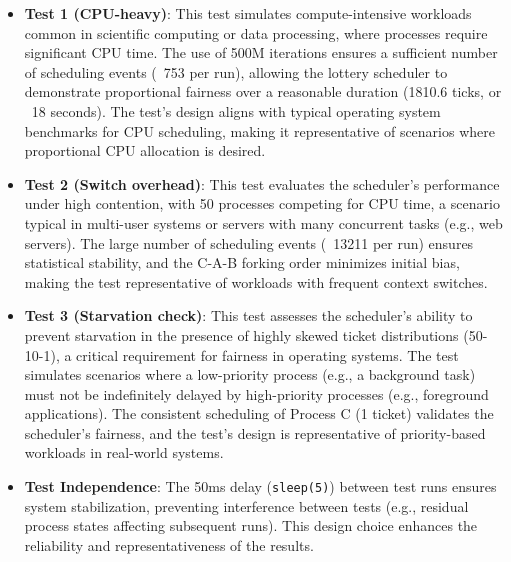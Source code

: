 \documentclass{article}
\begin{document}
\begin{itemize}
    \item \textbf{Test 1 (CPU-heavy)}: This test simulates compute-intensive workloads common in scientific computing or data processing, where processes require significant CPU time. The use of 500M iterations ensures a sufficient number of scheduling events (~753 per run), allowing the lottery scheduler to demonstrate proportional fairness over a reasonable duration (1810.6 ticks, or ~18 seconds). The test’s design aligns with typical operating system benchmarks for CPU scheduling, making it representative of scenarios where proportional CPU allocation is desired.
    \item \textbf{Test 2 (Switch overhead)}: This test evaluates the scheduler’s performance under high contention, with 50 processes competing for CPU time, a scenario typical in multi-user systems or servers with many concurrent tasks (e.g., web servers). The large number of scheduling events (~13211 per run) ensures statistical stability, and the C-A-B forking order minimizes initial bias, making the test representative of workloads with frequent context switches.
    \item \textbf{Test 3 (Starvation check)}: This test assesses the scheduler’s ability to prevent starvation in the presence of highly skewed ticket distributions (50-10-1), a critical requirement for fairness in operating systems. The test simulates scenarios where a low-priority process (e.g., a background task) must not be indefinitely delayed by high-priority processes (e.g., foreground applications). The consistent scheduling of Process C (1 ticket) validates the scheduler’s fairness, and the test’s design is representative of priority-based workloads in real-world systems.
    \item \textbf{Test Independence}: The 50ms delay (\texttt{sleep(5)}) between test runs ensures system stabilization, preventing interference between tests (e.g., residual process states affecting subsequent runs). This design choice enhances the reliability and representativeness of the results.
\end{itemize}
\end{document}
